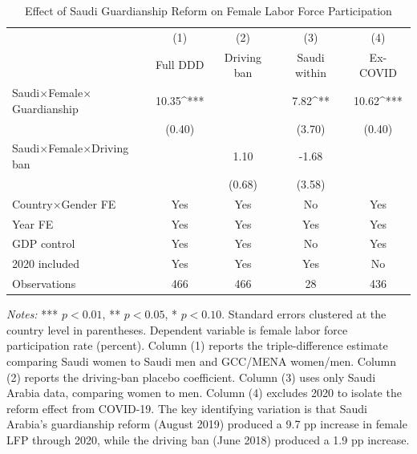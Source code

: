 \begin{table}[htbp]
\centering
\caption{Effect of Saudi Guardianship Reform on Female Labor Force Participation}
\label{tab:main}
\begin{tabular}{lcccc}
\hline\hline
 & (1) & (2) & (3) & (4) \\
 & Full DDD & Driving ban & Saudi within & Ex-COVID \\
\hline
Saudi$\times$Female$\times$Guardianship & 10.35^{***} & & 7.82^{**} & 10.62^{***} \\
 & (0.40) & & (3.70) & (0.40) \\
Saudi$\times$Female$\times$Driving ban & & 1.10 & -1.68 & \\
 & & (0.68) & (3.58) & \\
\hline
Country$\times$Gender FE & Yes & Yes & No & Yes \\
Year FE & Yes & Yes & Yes & Yes \\
GDP control & Yes & Yes & No & Yes \\
2020 included & Yes & Yes & Yes & No \\
Observations & 466 & 466 & 28 & 436 \\
\hline\hline
\end{tabular}
\begin{minipage}{0.95\textwidth}
{\footnotesize \textit{Notes:} *** $p<0.01$, ** $p<0.05$, * $p<0.10$. Standard errors clustered at the country level in parentheses. Dependent variable is female labor force participation rate (percent). Column (1) reports the triple-difference estimate comparing Saudi women to Saudi men and GCC/MENA women/men. Column (2) reports the driving-ban placebo coefficient. Column (3) uses only Saudi Arabia data, comparing women to men. Column (4) excludes 2020 to isolate the reform effect from COVID-19. The key identifying variation is that Saudi Arabia's guardianship reform (August 2019) produced a 9.7 pp increase in female LFP through 2020, while the driving ban (June 2018) produced a 1.9 pp increase.}
\end{minipage}
\end{table}

